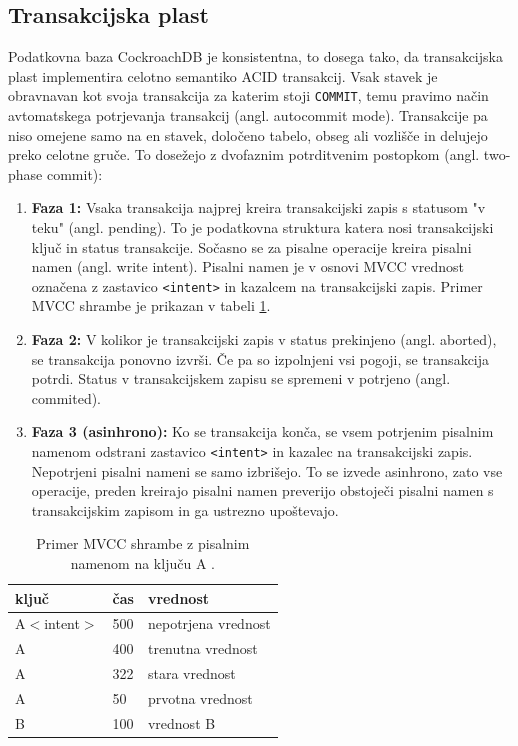 \documentclass[a4paper, 12pt]{book}
\begin{document}
\subsection{Transakcijska plast}
Podatkovna baza CockroachDB je konsistentna, to dosega tako, da transakcijska plast implementira celotno semantiko ACID transakcij. Vsak stavek je obravnavan kot svoja transakcija za katerim stoji \texttt{COMMIT}, temu pravimo način avtomatskega potrjevanja transakcij (angl. autocommit mode). Transakcije pa niso omejene samo na en stavek, določeno tabelo, obseg ali vozlišče in delujejo preko celotne gruče. To dosežejo z dvofaznim potrditvenim postopkom (angl. two-phase commit):

\begin{enumerate}
    \item \textbf{Faza 1:} Vsaka transakcija najprej kreira transakcijski zapis s statusom "v teku" (angl. pending). To je podatkovna struktura katera nosi transakcijski ključ in status transakcije. Sočasno se za pisalne operacije kreira pisalni namen (angl. write intent). Pisalni namen je v osnovi MVCC vrednost označena z zastavico \texttt{<intent>} in kazalcem na transakcijski zapis. Primer MVCC shrambe je prikazan v tabeli \ref{tbl_crdb_mvcc_store}.
    \item \textbf{Faza 2:} V kolikor je transakcijski zapis v status prekinjeno (angl. aborted), se transakcija ponovno izvrši. Če pa so izpolnjeni vsi pogoji, se transakcija potrdi. Status v transakcijskem zapisu se spremeni v potrjeno (angl. commited).
    \item \textbf{Faza 3 (asinhrono):} Ko se transakcija konča, se vsem potrjenim pisalnim namenom odstrani zastavico \texttt{<intent>} in kazalec na transakcijski zapis. Nepotrjeni pisalni nameni se samo izbrišejo. To se izvede asinhrono, zato vse operacije, preden kreirajo pisalni namen preverijo obstoječi pisalni namen s transakcijskim zapisom in ga ustrezno upoštevajo.
\end{enumerate}

\begin{table}[H]
\begin{center}
\begin{tabular}{ l|l|l } 
\textbf{ključ} & \textbf{čas} & \textbf{vrednost} \\
\hline
A$<$intent$>$ & 500 & nepotrjena vrednost \\
A & 400 & trenutna vrednost \\ 
A & 322 & stara vrednost \\ 
A & 50 & prvotna vrednost \\
B & 100 & vrednost B \\
\end{tabular}
\end{center}
\caption{Primer MVCC shrambe z pisalnim namenom na ključu A \cite{CRDB-blog-transaction-isolation}.}
\label{tbl_crdb_mvcc_store}
\end{table}
\end{document}
